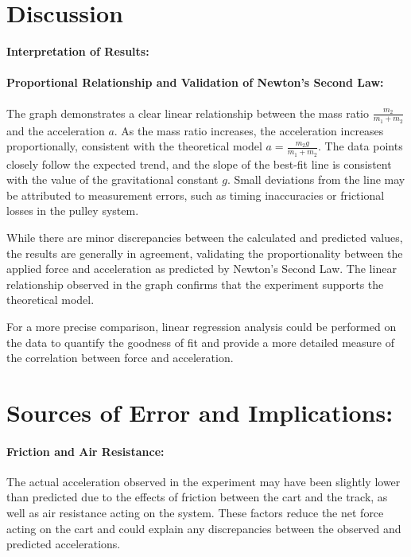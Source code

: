 \section{Discussion}

\textbf{Interpretation of Results:}

\paragraph{Proportional Relationship and Validation of Newton's Second Law:}

The graph demonstrates a clear linear relationship between the mass ratio \( \frac{m_2}{m_1 + m_2} \) and the acceleration \( a \). As the mass ratio increases, the acceleration increases proportionally, consistent with the theoretical model \( a = \frac{m_2 g}{m_1 + m_2} \). The data points closely follow the expected trend, and the slope of the best-fit line is consistent with the value of the gravitational constant \( g \). Small deviations from the line may be attributed to measurement errors, such as timing inaccuracies or frictional losses in the pulley system. 

While there are minor discrepancies between the calculated and predicted values, the results are generally in agreement, validating the proportionality between the applied force and acceleration as predicted by Newton's Second Law. The linear relationship observed in the graph confirms that the experiment supports the theoretical model.

For a more precise comparison, linear regression analysis could be performed on the data to quantify the goodness of fit and provide a more detailed measure of the correlation between force and acceleration.
 

\section{Sources of Error and Implications:}

\paragraph{Friction and Air Resistance:}

The actual acceleration observed in the experiment may have been slightly lower than predicted due to the effects of friction between the cart and the track, as well as air resistance acting on the system. These factors reduce the net force acting on the cart and could explain any discrepancies between the observed and predicted accelerations.

